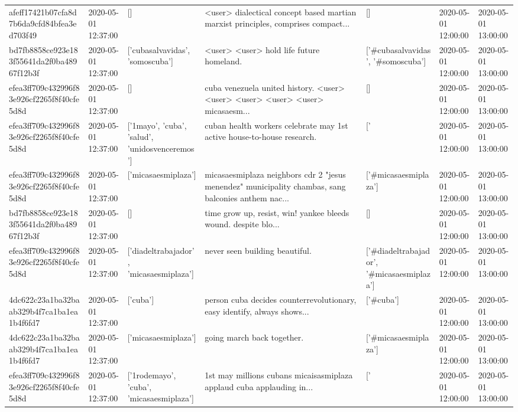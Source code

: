 \begin{tabular}{lllllll}
afeff17421b07cfa8d7b6da9cfd84bfea3ed703f49 & 2020-05-01 12:37:00 & [] & <user> dialectical concept based martian marxist principles, comprises compact... & [] & 2020-05-01 12:00:00 & 2020-05-01 13:00:00 \\
bd7fb8858ce923e183f55641da2f0ba48967f12b3f & 2020-05-01 12:37:00 & ['cubasalvavidas', 'somoscuba'] & <user> <user> hold life future homeland. & ['#cubasalvavidas', '#somoscuba'] & 2020-05-01 12:00:00 & 2020-05-01 13:00:00 \\
efea3ff709c432996f83e926cf2265f8f40cfe5d8d & 2020-05-01 12:37:00 & [] & cuba venezuela united history. <user> <user> <user> <user> <user> micasaesm... & [] & 2020-05-01 12:00:00 & 2020-05-01 13:00:00 \\
efea3ff709c432996f83e926cf2265f8f40cfe5d8d & 2020-05-01 12:37:00 & ['1mayo', 'cuba', 'salud', 'unidosvenceremos'] & cuban health workers celebrate may 1st active house-to-house research. & ['#1mayo', '#cuba', '#unidosvenceremos'] & 2020-05-01 12:00:00 & 2020-05-01 13:00:00 \\
efea3ff709c432996f83e926cf2265f8f40cfe5d8d & 2020-05-01 12:37:00 & ['micasaesmiplaza'] & micasaesmiplaza neighbors cdr 2 "jesus menendez" municipality chambas, sang balconies anthem nac... & ['#micasaesmiplaza'] & 2020-05-01 12:00:00 & 2020-05-01 13:00:00 \\
bd7fb8858ce923e183f55641da2f0ba48967f12b3f & 2020-05-01 12:37:00 & [] & time grow up, resist, win! yankee bleeds wound. despite blo... & [] & 2020-05-01 12:00:00 & 2020-05-01 13:00:00 \\
efea3ff709c432996f83e926cf2265f8f40cfe5d8d & 2020-05-01 12:37:00 & ['diadeltrabajador', 'micasaesmiplaza'] & never seen building beautiful. & ['#diadeltrabajador', '#micasaesmiplaza'] & 2020-05-01 12:00:00 & 2020-05-01 13:00:00 \\
4dc622c23a1ba32baab329b4f7ca1ba1ea1b4f6fd7 & 2020-05-01 12:37:00 & ['cuba'] & person cuba decides counterrevolutionary, easy identify, always shows... & ['#cuba'] & 2020-05-01 12:00:00 & 2020-05-01 13:00:00 \\
4dc622c23a1ba32baab329b4f7ca1ba1ea1b4f6fd7 & 2020-05-01 12:37:00 & ['micasaesmiplaza'] & going march back together. & ['#micasaesmiplaza'] & 2020-05-01 12:00:00 & 2020-05-01 13:00:00 \\
efea3ff709c432996f83e926cf2265f8f40cfe5d8d & 2020-05-01 12:37:00 & ['1rodemayo', 'cuba', 'micasaesmiplaza'] & 1st may millions cubans micaisasmiplaza applaud cuba applauding in... & ['#1rodemayo', '#cuba', '#micasaesmiplaza'] & 2020-05-01 12:00:00 & 2020-05-01 13:00:00 \\

\end{tabular}
